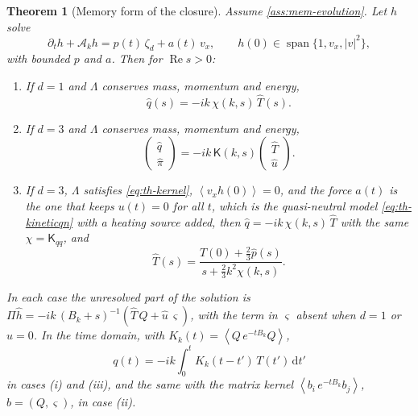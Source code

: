 \documentclass[11pt]{article}
\newcommand{\dd}{\,\mathrm d}
\newcommand{\av}[1]{\left\langle #1\right\rangle}
\newcommand{\A}{\mathcal A}
\newcommand{\Real}{\operatorname{Re}}
\newtheorem{theorem}{Theorem}[section]
\theoremstyle{definition}
\theoremstyle{remark}
\numberwithin{equation}{section}
\begin{document}
\begin{theorem}[Memory form of the closure]\label{thm:mem-closure}
Assume \cref{ass:mem-evolution}. Let $h$ solve
\begin{equation}
 \partial_th+\A_kh=p(t)\,\zeta_d+a(t)\,v_x,\qquad
 h(0)\in\operatorname{span}\{1,v_x,|v|^2\},
 \label{eq:mem-kinetic}
\end{equation}
with bounded $p$ and $a$. Then for $\Real s>0$:
\begin{enumerate}[label=(\roman*)]
\item If $d=1$ and $\Lambda$ conserves mass, momentum and energy,
\begin{equation}
 \widehat q(s)=-ik\,\chi(k,s)\,\widehat T(s).
 \label{eq:mem-1d}
\end{equation}
\item If $d=3$ and $\Lambda$ conserves mass, momentum and energy,
\begin{equation}
 \begin{pmatrix}\widehat q\\ \widehat\pi\end{pmatrix}
 =-ik\,\mathsf K(k,s)
 \begin{pmatrix}\widehat T\\ \widehat u\end{pmatrix}.
 \label{eq:mem-3d}
\end{equation}
\item If $d=3$, $\Lambda$ satisfies \eqref{eq:th-kernel}, $\av{v_xh(0)}=0$,
and the force $a(t)$ is the one that keeps $u(t)=0$ for all $t$, which is
the quasi-neutral model \eqref{eq:th-kineticqn} with a heating source
added, then $\widehat q=-ik\,\chi(k,s)\,\widehat T$ with the same
$\chi=\mathsf K_{qq}$, and
\begin{equation}
 \widehat T(s)=\frac{T(0)+\tfrac23\widehat p(s)}
                    {s+\tfrac23k^2\chi(k,s)} .
 \label{eq:mem-T}
\end{equation}
\end{enumerate}
In each case the unresolved part of the solution is
$\Pi\widehat h=-ik\,(B_k+s)^{-1}(\widehat T\,Q+\widehat u\,\varsigma)$,
with the term in $\varsigma$ absent when $d=1$ or $u=0$. In the time
domain, with $K_k(t)=\av{Q\,e^{-tB_k}Q}$,
\begin{equation}
 q(t)=-ik\int_0^tK_k(t-t')\,T(t')\dd t'
 \label{eq:mem-time}
\end{equation}
in cases (i) and (iii), and the same with the matrix kernel
$\av{b_i\,e^{-tB_k}b_j}$, $b=(Q,\varsigma)$, in case (ii).
\end{theorem}
\end{document}

